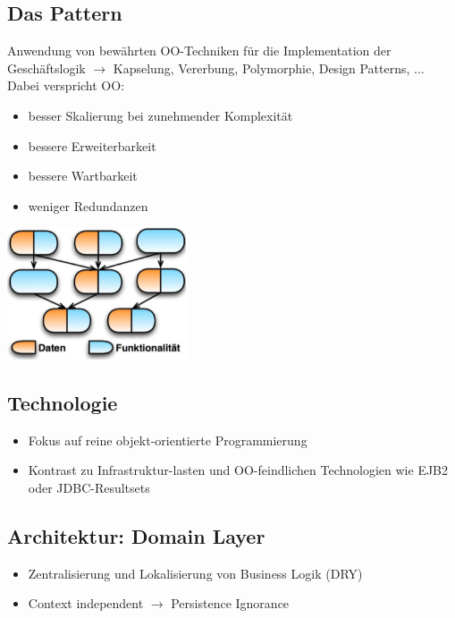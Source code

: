 \documentclass{report}
\newenvironment{Figure}
	{\par\medskip\noindent\minipage{\linewidth}}
	{\endminipage\par\medskip}
\theoremstyle{definition}
\theoremstyle{example}
\begin{document}
\subsection{Das Pattern}
Anwendung von bewährten OO-Techniken für die Implementation der Geschäftslogik $\rightarrow$ Kapselung, Vererbung, Polymorphie, Design Patterns, ...\\
Dabei verspricht OO:
\begin{itemize}
	\item besser Skalierung bei zunehmender Komplexität
	\item bessere Erweiterbarkeit
	\item bessere Wartbarkeit
	\item weniger Redundanzen
\end{itemize}
\begin{Figure}
\centering
\includegraphics[width=200px]{img/JPAPattern.png}
	\label{fig:Das Pattern vom Domain Model}
\end{Figure}

\subsection{Technologie}
\begin{itemize}
	\item Fokus auf reine objekt-orientierte Programmierung
	\item Kontrast zu Infrastruktur-lasten und OO-feindlichen Technologien wie EJB2 oder JDBC-Resultsets
\end{itemize}

\subsection{Architektur: Domain Layer}
\begin{itemize}
	\item Zentralisierung und Lokalisierung von Business Logik (DRY)
	\item Context independent $\rightarrow$ Persistence Ignorance
\end{itemize}
\end{document}
